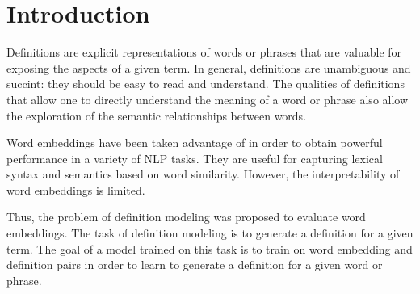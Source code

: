 \section{Introduction}
Definitions are explicit representations of words or phrases that are valuable
for exposing the aspects of a given term. In general, definitions are
unambiguous and succint: they should be easy to read and understand. The
qualities of definitions that allow one to directly understand the meaning of a
word or phrase also allow the exploration of the semantic relationships between
words.

Word embeddings have been taken advantage of in order to obtain powerful
performance in a variety of NLP tasks. They are useful for capturing lexical
syntax and semantics based on word similarity. However, the interpretability of
word embeddings is limited.

Thus, the problem of definition modeling \cite{noraset_definition_2016} was
proposed to evaluate word embeddings. The task of definition modeling is to
generate a definition for a given term. The goal of a model trained on this task
is to train on word embedding and definition pairs in order to learn to generate
a definition for a given word or phrase.
